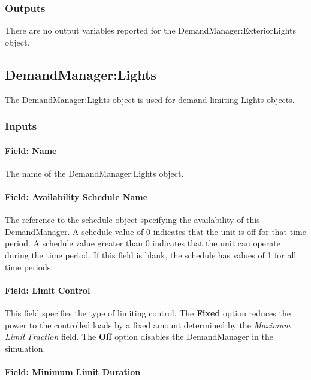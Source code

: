 \subsubsection{Outputs}\label{outputs-1-005}

There are no output variables reported for the DemandManager:ExteriorLights object.

\subsection{DemandManager:Lights}\label{demandmanagerlights}

The DemandManager:Lights object is used for demand limiting Lights objects.

\subsubsection{Inputs}\label{inputs-2-009}

\paragraph{Field: Name}\label{field-name-2-008}

The name of the DemandManager:Lights object.

\paragraph{Field: Availability Schedule Name}\label{field-availability-schedule-name-1-001}

The reference to the schedule object specifying the availability of this DemandManager. A schedule value of 0 indicates that the unit is off for that time period. A schedule value greater than 0 indicates that the unit can operate during the time period. If this field is blank, the schedule has values of 1 for all time periods.

\paragraph{Field: Limit Control}\label{field-limit-control-1}

This field specifies the type of limiting control. The \textbf{Fixed} option reduces the power to the controlled loads by a fixed amount determined by the \emph{Maximum Limit Fraction} field. The \textbf{Off} option disables the DemandManager in the simulation.

\paragraph{Field: Minimum Limit Duration}\label{field-minimum-limit-duration-1}

